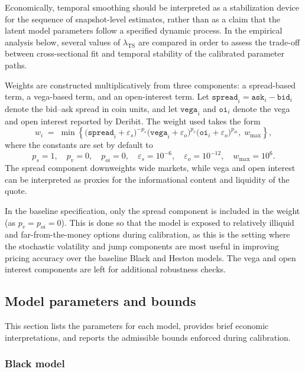 \documentclass[a4paper,titlepage,12pt]{report}
\theoremstyle{plain}
\begin{document}
Economically, temporal smoothing should be interpreted as a stabilization device for the sequence of snapshot-level estimates, rather than as a claim that the latent model parameters follow a specified dynamic process. In the empirical analysis below, several values of $\lambda_{\mathrm{TS}}$ are compared in order to assess the trade-off between cross-sectional fit and temporal stability of the calibrated parameter paths.

Weights are constructed multiplicatively from three components: a spread-based term, a vega-based term, and an open-interest term. Let $\texttt{spread}_i = \texttt{ask}_i-\texttt{bid}_i$ denote the bid--ask spread in coin units, and let $\texttt{vega}_i$ and $\texttt{oi}_i$ denote the vega and open interest reported by Deribit. The weight used takes the form
\begin{equation}\label{eq:weights}
w_i
\;=\;
\min\!\left\{
\bigl(\texttt{spread}_i + \varepsilon_s\bigr)^{-p_s}
\bigl(\texttt{vega}_i + \varepsilon_o\bigr)^{p_v}
\bigl(\texttt{oi}_i + \varepsilon_o\bigr)^{p_{oi}},
\; w_{\max}
\right\},
\end{equation}
where the constants are set by default to
\[
p_s = 1,\quad p_v = 0,\quad p_{oi} = 0,\quad
\varepsilon_s = 10^{-6},\quad \varepsilon_o = 10^{-12},\quad
w_{\max}=10^{6}.
\]
The spread component downweights wide markets, while vega and open interest can be interpreted as proxies for the informational content and liquidity of the quote. 

In the baseline specification, only the spread component is included in the weight (as $p_v=p_{oi}=0$). This is done so that the model is exposed to relatively illiquid and far-from-the-money options during calibration, as this is the setting where the stochastic volatility and jump components are most useful in improving pricing accuracy over the baseline Black and Heston models. The vega and open interest components are left for additional robustness checks.

\subsection{Model parameters and bounds}\label{subsec:params_bounds}

This section lists the parameters for each model, provides brief economic interpretations, and reports the admissible bounds enforced during calibration.

\subsubsection{Black model}
\end{document}

